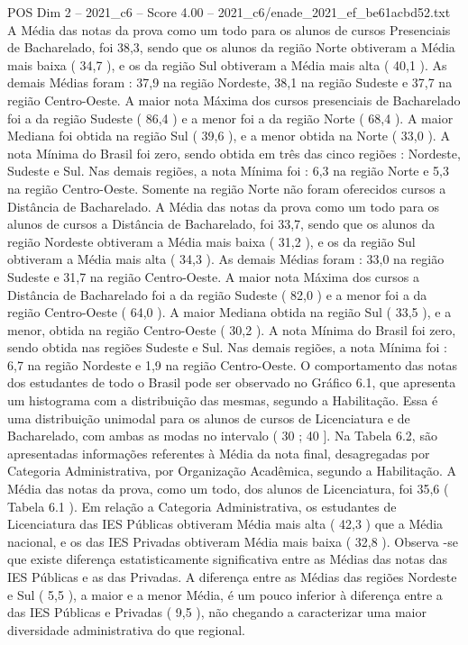 \begin{textsample}{POS Dim 2 – 2021\_c6 – Score 4.00 – 2021\_c6/enade\_2021\_ef\_be61acbd52.txt}
A Média das notas da prova como um todo para os alunos de cursos Presenciais de Bacharelado, foi 38,3, sendo que os alunos da região Norte obtiveram a Média mais baixa ( 34,7 ), e os da região Sul obtiveram a Média mais alta ( 40,1 ).
As demais Médias foram : 37,9 na região Nordeste, 38,1 na região Sudeste e 37,7 na região Centro-Oeste.
A maior nota Máxima dos cursos presenciais de Bacharelado foi a da região Sudeste ( 86,4 ) e a menor foi a da região Norte ( 68,4 ).
A maior Mediana foi obtida na região Sul ( 39,6 ), e a menor obtida na Norte ( 33,0 ).
A nota Mínima do Brasil foi zero, sendo obtida em três das cinco regiões : Nordeste, Sudeste e Sul.
Nas demais regiões, a nota Mínima foi : 6,3 na região Norte e 5,3 na região Centro-Oeste.
Somente na região Norte não foram oferecidos cursos a Distância de Bacharelado.
A Média das notas da prova como um todo para os alunos de cursos a Distância de Bacharelado, foi 33,7, sendo que os alunos da região Nordeste obtiveram a Média mais baixa ( 31,2 ), e os da região Sul obtiveram a Média mais alta ( 34,3 ).
As demais Médias foram : 33,0 na região Sudeste e 31,7 na região Centro-Oeste.
A maior nota Máxima dos cursos a Distância de Bacharelado foi a da região Sudeste ( 82,0 ) e a menor foi a da região Centro-Oeste ( 64,0 ).
A maior Mediana obtida na região Sul ( 33,5 ), e a menor, obtida na região Centro-Oeste ( 30,2 ).
A nota Mínima do Brasil foi zero, sendo obtida nas regiões Sudeste e Sul.
Nas demais regiões, a nota Mínima foi : 6,7 na região Nordeste e 1,9 na região Centro-Oeste.
O comportamento das notas dos estudantes de todo o Brasil pode ser observado no Gráfico 6.1, que apresenta um histograma com a distribuição das mesmas, segundo a Habilitação.
Essa é uma distribuição unimodal para os alunos de cursos de Licenciatura e de Bacharelado, com ambas as modas no intervalo ( 30 ; 40 ].
Na Tabela 6.2, são apresentadas informações referentes à Média da nota final, desagregadas por Categoria Administrativa, por Organização Acadêmica, segundo a Habilitação.
A Média das notas da prova, como um todo, dos alunos de Licenciatura, foi 35,6 ( Tabela 6.1 ).
Em relação a Categoria Administrativa, os estudantes de Licenciatura das IES Públicas obtiveram Média mais alta ( 42,3 ) que a Média nacional, e os das IES Privadas obtiveram Média mais baixa ( 32,8 ).
Observa -se que existe diferença estatisticamente significativa entre as Médias das notas das IES Públicas e as das Privadas.
A diferença entre as Médias das regiões Nordeste e Sul ( 5,5 ), a maior e a menor Média, é um pouco inferior à diferença entre a das IES Públicas e Privadas ( 9,5 ), não chegando a caracterizar uma maior diversidade administrativa do que regional.

\end{textsample}
